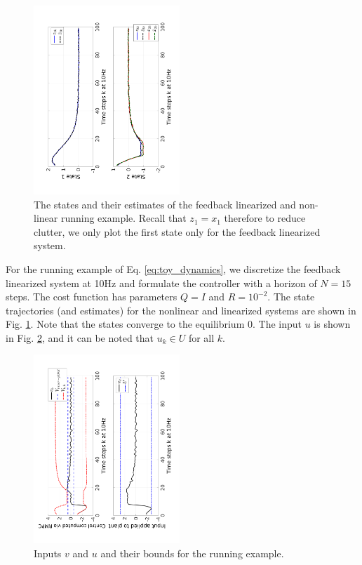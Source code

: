 \begin{figure}
	\centering	
	\includegraphics[angle=270,width=0.49\textwidth]{figs/AllStates_toy.pdf}
	\caption{The states and their estimates of the feedback linearized and non-linear running example. Recall that $z_1 = x_1$ therefore to reduce clutter, we only plot the first state only for the feedback linearized system.}
	\label{fig:AllStates_toy}
\end{figure}


For the running example of Eq. \ref{eq:toy_dynamics}, we discretize the feedback linearized system at 10Hz and formulate the controller with a horizon of $N=15$ steps. 
The cost function has parameters $Q=I$ and $R=10^{-2}$.
The state trajectories (and estimates) for the nonlinear and linearized systems are shown in Fig. \ref{fig:AllStates_toy}.
Note that the states converge to the equilibrium 0. The input $u$ is shown in Fig. \ref{fig:input toy}, and it can be noted that $u_k \in U$ for all $k$.

\begin{figure}
	\centering	
	\includegraphics[angle=270,width=0.49\textwidth]{figs/u_and_v_toy.pdf}
	\caption{Inputs $v$ and $u$ and their bounds for the running example.}
	\label{fig:input toy}
\end{figure}


